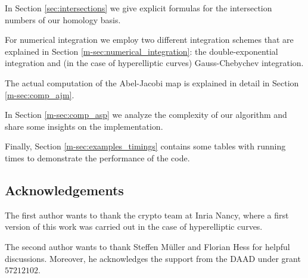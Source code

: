 \documentclass[main.tex]{subfiles}
\begin{document}
  In Section \ref{sec:intersections} we give explicit formulas for the
  intersection numbers of our homology basis.

  For numerical integration we employ two different integration schemes that
  are explained in Section \ref{m-sec:numerical_integration}: the
  double-exponential integration and
  (in the case of hyperelliptic curves) Gauss-Chebychev integration.

  The actual computation of the Abel-Jacobi map is explained in detail in
  Section \ref{m-sec:comp_ajm}.

  In Section \ref{m-sec:comp_asp} we analyze the complexity of our algorithm
  and share some insights on the implementation.

  Finally, Section \ref{m-sec:examples_timings} contains some tables with
  running times to demonstrate the performance of the code.

  \subsection{Acknowledgements}

  The first author wants to thank the crypto team at Inria Nancy, where
  a first version of this work was carried out in the case of hyperelliptic
  curves.

  The second author wants to thank Steffen Müller and Florian Hess for helpful discussions.
  Moreover, he acknowledges the support from the DAAD under grant $57212102$.
\end{document}
